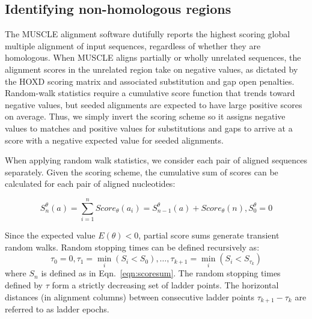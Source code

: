 \documentclass[twoside,11pt]{article}
\begin{document}
\subsection{Identifying non-homologous regions}

The MUSCLE alignment software dutifully reports the highest scoring global multiple alignment of input sequences, regardless of whether they are homologous.  When MUSCLE aligns partially or wholly unrelated sequences, the alignment scores in the unrelated region take on negative values, as dictated by the HOXD scoring matrix and associated substitution and gap open penalties.  Random-walk statistics require a cumulative score function that trends toward negative values, but seeded alignments are expected to have large positive scores on average.  Thus, we simply invert the scoring scheme so it assigns negative values to matches and positive values for substitutions and gaps to arrive at a score with a negative expected value for seeded alignments.

When applying random walk statistics, we consider each pair of aligned sequences separately.  Given the scoring scheme, the cumulative sum of scores can be calculated for each pair of aligned nucleotides:

\begin{equation}
\label{eqn:scoresum}
S_n^\theta(a) = \sum_{i=1}^{n} Score_\theta(a_i) = S_{n-1}^\theta(a) + Score_\theta(n), S_0^\theta = 0
\end{equation}

Since the expected value $E(\theta) < 0$, partial score sums generate transient random walks.  Random stopping times can be defined recursively as:
\begin{equation}
\label{eqn:stoppingtimes}
\tau_0 = 0, \tau_1 = \min_i(S_i < S_0),\dots,\tau_{k+1} = \min_i(S_i < S_{\tau_k})
\end{equation}
where $S_n$ is defined as in Eqn.~\ref{eqn:scoresum}.  The random stopping times defined by $\tau$ form a strictly decreasing set of ladder points.  The horizontal distances (in alignment columns) between consecutive ladder points $\tau_{k+1}-\tau_{k}$ are referred to as ladder epochs.
\end{document}
